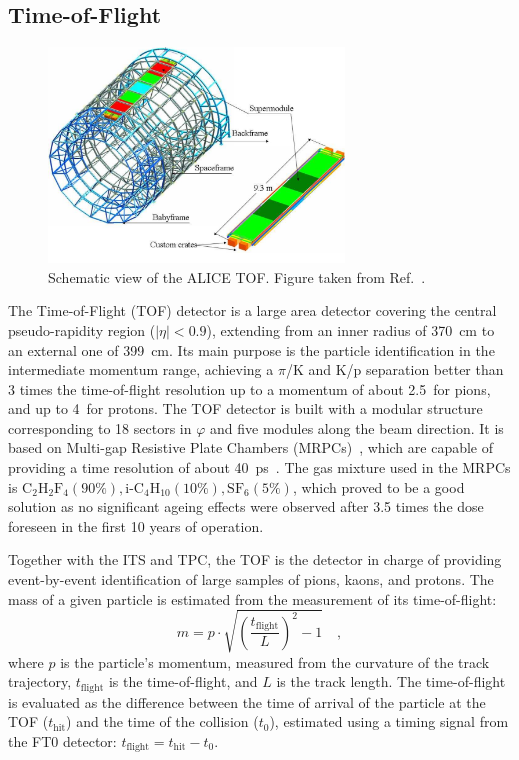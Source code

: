 \subsection{Time-of-Flight}
\begin{figure}[h!]
    \centering
    \includegraphics[width=0.7\textwidth]{Figures/Chapter 3/TOF_Scheme.png}
    \caption{Schematic view of the ALICE TOF. Figure taken from Ref.~\cite{ALICE:2014sbx}.}
    \label{fig:TOF}
\end{figure}
The Time-of-Flight (TOF) detector is a large area detector covering the central pseudo-rapidity region ($\lvert\eta\rvert < 0.9$), extending from an inner radius of 370~cm to an external one of 399~cm. Its main purpose is the particle identification in the intermediate momentum range, achieving a $\pi$/K and K/p separation better than 3 times the time-of-flight resolution up to a momentum of about 2.5~\gevc for pions, and up to 4~\gevc for protons. The TOF detector is built with a modular structure corresponding to 18 sectors in $\varphi$ and five modules along the beam direction. It is based on Multi-gap Resistive Plate Chambers (MRPCs)~\cite{Wang:2020iwn}, which are capable of providing a time resolution of about 40~ps~\cite{ALICE:2008ngc}. The gas mixture used in the MRPCs is $\mathrm{C_2H_2F_4 (90\%), i\text{-}C_4H_{10} (10\%), SF_6 (5\%)}$, which proved to be a good solution as no significant ageing effects were observed after 3.5 times the dose foreseen in the first 10 years of operation.

Together with the ITS and TPC, the TOF is the detector in charge of providing event-by-event identification of large samples of pions, kaons, and protons. The mass of a given particle is estimated from the measurement of its time-of-flight:
\begin{equation}
    m = p \cdot \sqrt{\left(\frac{t_\mathrm{flight}}{L}\right)^2 - 1}\quad ,
\end{equation} 
where $p$ is the particle's momentum, measured from the curvature of the track trajectory, $t_\mathrm{flight}$ is the time-of-flight, and $L$ is the track length. The time-of-flight is evaluated as the difference between the time of arrival of the particle at the TOF ($t_\mathrm{hit}$) and the time of the collision ($t_0$), estimated using a timing signal from the FT0 detector: $t_\mathrm{flight} = t_\mathrm{hit} - t_0$.

